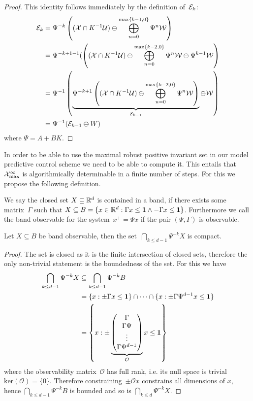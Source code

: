 %
\begin{proof}
This identity follows immediately by the definition of~$\mathcal E_k$:
%
\begin{equation}\begin{aligned}
	\mathcal E_k &= \Psi^{-k}\left((\mathcal X\cap K^{-1}\mathcal U)\ominus\bigoplus_{n=0}^{\max\{k-1,0\}}\Psi^n\mathcal W\right)\\
	&= \Psi^{-k+1-1}(\left((\mathcal X\cap K^{-1}\mathcal U)\ominus\bigoplus_{n=0}^{\max\{k-2,0\}}\Psi^n\mathcal W \ominus \Psi^{k-1}\mathcal W \right)\\
	&= \Psi^{-1}\left(\underbrace{\Psi^{-k+1}\left((\mathcal X\cap K^{-1}\mathcal U)\ominus\bigoplus_{n=0}^{\max\{k-2,0\}}\Psi^n\mathcal W\right)}_{\mathcal E_{k-1}}\ominus\mathcal W\right)\\
	&=\Psi^{-1}(\mathcal E_{k-1}\ominus W)
\end{aligned}\end{equation}
%
where $\Psi=A+BK$.
\end{proof}
%
%
\noindent In order to be able to use the maximal robust positive invariant set in our model predictive control scheme we need to be able to compute it.
%
This entails that~$\mathcal X^\infty_{\max}$ is algorithmically determinable in a finite number of steps.
%
For this we propose the following definition.
%
\begin{defi}
We say the closed set $X\subseteq\mathbb R^d$ is contained in a band, if there exists some matrix~$\Gamma$ such that $X\subseteq B = \{x\in\mathbb R^d:\Gamma x\leq \mathbf{1}\wedge -\Gamma x\leq\mathbf{1}\}$. 
%
Furthermore we call the band observable for the system~$x^+=\Psi x$ if the pair $(\Psi,\Gamma)$ is observable.
\end{defi}
%
\begin{cor}\label{thm:band:observability}
Let $X\subseteq B$ be band observable, then the set~$\bigcap_{k\leq d-1}\Psi^{-k}X$ is compact.
\end{cor}
%
\begin{proof}
The set is closed as it is the finite intersection of closed sets, therefore the only non-trivial statement is the boundedness of the set.
%
For this we have
%
\begin{equation}\begin{aligned}
	\bigcap_{k\leq d-1}\Psi^{-k} X&\subseteq \bigcap_{k\leq d-1} \Psi^{-k}B\\
	&= \{x:\pm\Gamma x\leq\mathbf{1}\}\cap\dots\cap\{x:\pm\Gamma\Psi^{d-1}x\leq\mathbf{1}\}\\
	&= \left\{x:\pm\underbrace{\begin{pmatrix}\Gamma\\ \Gamma\Psi\\ \vdots\\ \Gamma\Psi^{d-1} \end{pmatrix}}_{\mathcal O}x\leq\mathbf{1}\right\}
\end{aligned}\end{equation}
%
where the observability matrix~$\mathcal O$ has full rank, i.e. its null space is trivial~$\text{ker}(\mathcal O)=\{0\}$.
%
Therefore constraining~$\pm\mathcal Ox$ constrains all dimensions of $x$, hence $\bigcap_{k\leq d-1}\Psi^{-k}B$ is bounded and so is $\bigcap_{k\leq d}\Psi^{-k} X$.
\end{proof}
